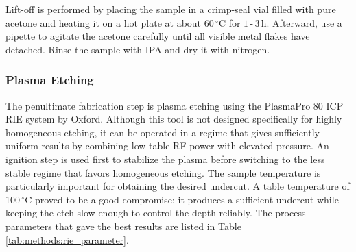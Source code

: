         Lift-off is performed by placing the sample in a crimp-seal vial filled with pure acetone and heating it on a hot plate at about 60\,$^\circ$C for $1\,\text{-}\,3\,\mathrm{h}$. Afterward, use a pipette to agitate the acetone carefully until all visible metal flakes have detached. Rinse the sample with IPA and dry it with nitrogen.

    \subsubsection*{Plasma Etching}
        The penultimate fabrication step is plasma etching using the PlasmaPro 80 ICP RIE system by Oxford. Although this tool is not designed specifically for highly homogeneous etching, it can be operated in a regime that gives sufficiently uniform results by combining low table RF power with elevated pressure. An ignition step is used first to stabilize the plasma before switching to the less stable regime that favors homogeneous etching. The sample temperature is particularly important for obtaining the desired undercut. A table temperature of 100\,$^\circ$C proved to be a good compromise: it produces a sufficient undercut while keeping the etch slow enough to control the depth reliably. The process parameters that gave the best results are listed in Table \ref{tab:methods:rie_parameter}.
